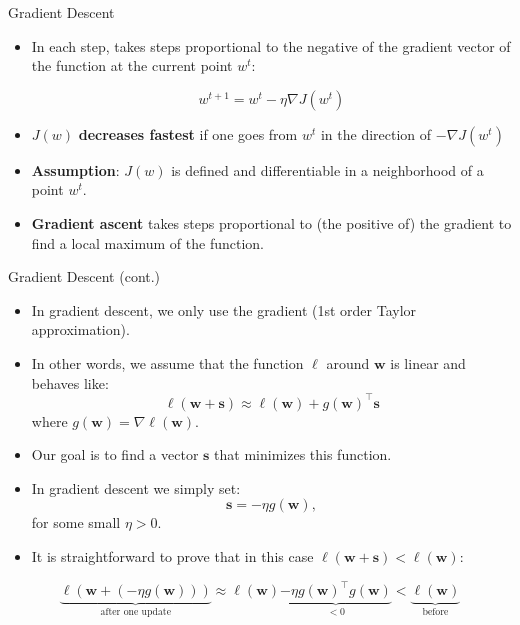 \documentclass[serif, aspectratio=169]{beamer}
\begin{document}
\begin{frame}{Gradient Descent}

    \begin{itemize}
        \item In each step, takes steps proportional to the negative of the gradient vector of the function at the current point \( w^t \):

        \[
        w^{t+1} = w^t - \eta \nabla J(w^t)
        \]

        \item \( J(w) \) \textbf{decreases fastest} if one goes from \( w^t \) in the direction of \( -\nabla J(w^t) \)

        \item \textbf{Assumption}: \( J(w) \) is defined and differentiable in a neighborhood of a point \( w^t \).
        \item \textbf{Gradient ascent} takes steps proportional to (the positive of) the gradient to find a local maximum of the function.


    \end{itemize}

\end{frame}


\begin{frame}{Gradient Descent (cont.)}
    \begin{itemize}
        \item In gradient descent, we only use the gradient (1st order Taylor approximation).
        \item In other words, we assume that the function $\ell$ around $\mathbf{w}$ is linear and behaves like:
        \[
        \ell(\mathbf{w} + \mathbf{s}) \approx \ell(\mathbf{w}) + g(\mathbf{w})^{\top} \mathbf{s}
        \]
        where $g(\mathbf{w}) = \nabla \ell(\mathbf{w})$.
        \item Our goal is to find a vector $\mathbf{s}$ that minimizes this function.
        \item In gradient descent we simply set:
        \[
        \mathbf{s} = -\eta g(\mathbf{w}),
        \]
        for some small $\eta > 0$.
        \item It is straightforward to prove that in this case $\ell(\mathbf{w} + \mathbf{s}) < \ell(\mathbf{w})$:
    \end{itemize}

    \vspace{0.0cm}
    \begin{equation*}
        \underbrace{\ell(\mathbf{w} + (-\eta g(\mathbf{w})))}_{\text{after one update}}
        \approx
        \ell(\mathbf{w}) \underbrace{- \eta g(\mathbf{w})^{\top} g(\mathbf{w})}_{<0}
        <
        \underbrace{\ell(\mathbf{w})}_{\text{before}}
    \end{equation*}
\end{frame}
\end{document}
